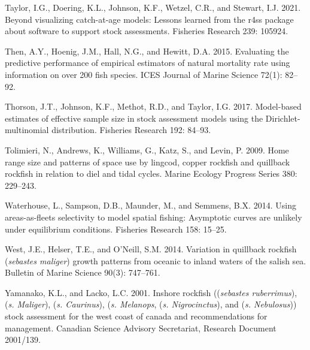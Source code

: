 \documentclass[11pt,
  english,
  letterpaper,
]{article}
\begin{document}
\leavevmode\hypertarget{ref-r4ss_2021}{}%
Taylor, I.G., Doering, K.L., Johnson, K.F., Wetzel, C.R., and Stewart, I.J. 2021. Beyond visualizing catch-at-age models: Lessons learned from the r4ss package about software to support stock assessments. Fisheries Research 239: 105924.

\leavevmode\hypertarget{ref-then_evaluating_2015-1}{}%
Then, A.Y., Hoenig, J.M., Hall, N.G., and Hewitt, D.A. 2015. Evaluating the predictive performance of empirical estimators of natural mortality rate using information on over 200 fish species. ICES Journal of Marine Science 72(1): 82--92.

\leavevmode\hypertarget{ref-thorson_model-based_2017}{}%
Thorson, J.T., Johnson, K.F., Methot, R.D., and Taylor, I.G. 2017. Model-based estimates of effective sample size in stock assessment models using the Dirichlet-multinomial distribution. Fisheries Research 192: 84--93.

\leavevmode\hypertarget{ref-tolimieri_home_2009}{}%
Tolimieri, N., Andrews, K., Williams, G., Katz, S., and Levin, P. 2009. Home range size and patterns of space use by lingcod, copper rockfish and quillback rockfish in relation to diel and tidal cycles. Marine Ecology Progress Series 380: 229--243.

\leavevmode\hypertarget{ref-Waterhouseetal_spatialSelex_2014}{}%
Waterhouse, L., Sampson, D.B., Maunder, M., and Semmens, B.X. 2014. Using areas-as-fleets selectivity to model spatial fishing: Asymptotic curves are unlikely under equilibrium conditions. Fisheries Research 158: 15--25.

\leavevmode\hypertarget{ref-Westetal_2014}{}%
West, J.E., Helser, T.E., and O'Neill, S.M. 2014. Variation in quillback rockfish (\emph{sebastes maliger}) growth patterns from oceanic to inland waters of the salish sea. Bulletin of Marine Science 90(3): 747--761.

\leavevmode\hypertarget{ref-YamanakaandLacko_rockfish_2001}{}%
Yamanako, K.L., and Lacko, L.C. 2001. Inshore rockfish ((\emph{sebastes ruberrimus}), (\emph{s. Maliger}), (\emph{s. Caurinus}), (\emph{s. Melanops}, (\emph{s. Nigrocinctus}), and (\emph{s. Nebulosus})) stock assessment for the west coast of canada and recommendations for management. Canadian Science Advisory Secretariat, Research Document 2001/139.

\leavevmode\tagmcend\tagstructend

\clearpage

\end{document}

